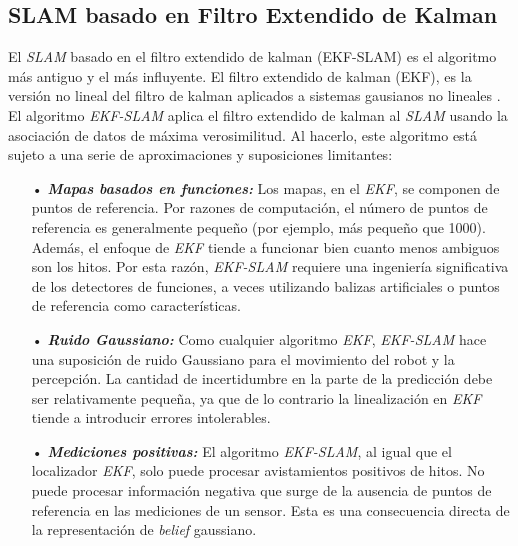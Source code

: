\subsection{SLAM basado en Filtro Extendido de Kalman}
El \textit{SLAM} basado en el filtro extendido de kalman (EKF-SLAM) es el algoritmo 
m\'as antiguo y el m\'as influyente. El filtro extendido de kalman (EKF), es la versión 
no lineal del filtro de kalman aplicados a sistemas gausianos no lineales \cite{Thrun2005}.
El algoritmo \textit{EKF-SLAM} aplica el filtro extendido de kalman al \textit{SLAM} 
usando la asociaci\'on de datos de m\'axima verosimilitud. Al hacerlo, este algoritmo
est\'a sujeto a una serie de aproximaciones y suposiciones limitantes:
\begin{itemize}
	\item[•] \textit{\textbf{Mapas basados en funciones:}} Los mapas, en el \textit{EKF}, se 
  componen de puntos de referencia. Por razones de computaci\'on, el n\'umero de puntos de 
  referencia es generalmente peque\~no (por ejemplo, m\'as peque\~no que 1000). Adem\'as, el 
  enfoque de \textit{EKF} tiende a funcionar bien cuanto menos ambiguos son los hitos. Por 
  esta raz\'on, \textit{EKF-SLAM} requiere una ingenier\'ia significativa de los detectores 
  de funciones, a veces utilizando balizas artificiales o puntos de referencia como 
  caracter\'isticas.
	\item[•] \textit{\textbf{Ruido Gaussiano:}} Como cualquier algoritmo \textit{EKF}, 
  \textit{EKF-SLAM} hace una suposici\'on de ruido Gaussiano para el movimiento del robot y 
  la percepci\'on. La cantidad de incertidumbre en la parte de la predicci\'on debe ser 
  relativamente peque\~na, ya que de lo contrario la linealizaci\'on en \textit{EKF} tiende 
  a introducir errores intolerables.
	\item[•] \textit{\textbf{Mediciones positivas:}} El algoritmo \textit{EKF-SLAM}, al igual 
	que el localizador \textit{EKF}, solo puede procesar avistamientos positivos de hitos. No
	puede procesar informaci\'on negativa que surge de la ausencia de puntos de referencia en 
	las mediciones de un sensor. Esta es una consecuencia directa de la representaci\'on
	de \textit{belief} gaussiano.
\end{itemize}

